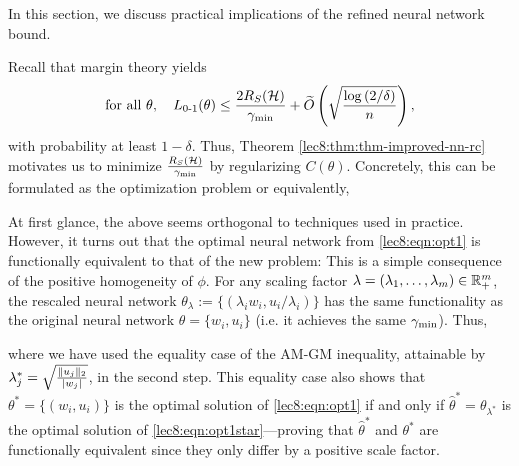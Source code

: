 In this section, we discuss practical implications of the refined neural network bound. 


Recall that margin theory yields
\begin{equation}
\text{for all } \theta, \quad L_{\textup{0-1}}(\theta) \leq \frac{2R_S(\mathcal H)}{\gamma_{\mathrm{min}}} + \widetilde{O}\left(\sqrt{\frac{\log \left( 2 / \delta \right)}{n}}\right), \label{lec8:eqn:margin-bound}
\end{equation}
with probability at least $1 -\delta$. Thus, Theorem \ref{lec8:thm:thm-improved-nn-rc} motivates us to minimize $\frac{R_S(\mathcal H)}{\gamma_{\mathrm{min}}}$ by regularizing $C(\theta)$. Concretely, this can be formulated as the optimization problem 
or equivalently,

At first glance, the above seems orthogonal to techniques used in practice. However, it turns out that the optimal neural network from \eqref{lec8:eqn:opt1} is functionally equivalent to that of the new problem:
This is a simple consequence of the positive homogeneity of $\phi$. For any scaling factor $\lambda=(\lambda_1, \dots, \lambda_m)\in \mathbb R_+^m$, the rescaled neural network $\theta_\lambda := \{(\lambda_i w_i, u_i/\lambda_i)\}$ has the same functionality as the original neural network $\theta = \{w_i, u_i \}$ (i.e. it achieves the same $\gamma_{\mathrm{min}}$). Thus, 

where we have used the equality case of the AM-GM inequality, attainable by $\lambda_j^* = \sqrt{\frac{\|u_j\|_2}{|w_j|}}$, in the second step. This equality case also shows that $\theta^* = \{(w_i, u_i ) \}$ is the optimal solution of \eqref{lec8:eqn:opt1} if and only if $\hat{\theta}^* = \theta_{\lambda^*}$ is the optimal solution of \eqref{lec8:eqn:opt1star}---proving that $\hat{\theta}^*$ and $\theta^*$ are functionally equivalent since they only differ by a positive scale factor. 



